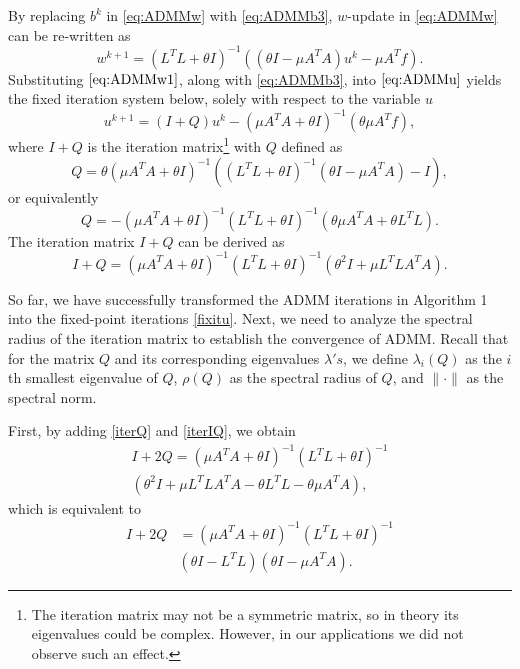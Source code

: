 \documentclass[letterpaper]{article} %
\begin{document}
By replacing $b^k$ in \eqref{eq:ADMMw} with \eqref{eq:ADMMb3}, $w$-update in \eqref{eq:ADMMw} can be re-written as
\begin{equation} \label{eq:ADMMw1}
w^{k + 1} = {( { {L^T}L + \theta I})^{ - 1}}( {( {\theta I - \mu{A^T}A}){u^k} - \mu{A^T}f}).
\end{equation}
Substituting $\eqref{eq:ADMMw1}$, along with \eqref{eq:ADMMb3}, into $\eqref{eq:ADMMu}$ yields the fixed iteration system below, solely with respect to the variable $u$
\begin{equation}\label{fixitu}
	u^{k+1} = \left(I+ Q\right) u^{k} - \left(\mu A^T A+\theta I\right)^{-1}\left(\theta \mu A^T f\right),
\end{equation}
where $I+Q$ is the iteration matrix\footnote{The iteration matrix may not be a symmetric matrix, so in theory its eigenvalues could be complex. However, in our applications we did not observe such an effect.} with $Q$ defined as
\begin{equation*}
    Q = \theta (\mu A^T A+\theta I)^{-1} ( ( {L^T}L +\theta I)^{-1} (\theta I -  \mu A^T A ) - I),
\end{equation*}
or equivalently
\begin{equation}\label{iterQ}
    Q = - (\mu A^T A + \theta I)^{-1} (L^T L + \theta I)^{-1} ( \theta \mu A^T A + \theta L^T L).
\end{equation}
The iteration matrix $I+Q$ can be derived as
\begin{equation}\label{iterIQ}
    I+Q = (\mu A^T A + \theta I)^{-1} (L^T L + \theta I)^{-1} ( \theta^2 I + \mu L^T L A^T A).
\end{equation}


So far, we have successfully transformed the ADMM iterations in Algorithm 1 into the fixed-point iterations \eqref{fixitu}. Next, we need to analyze the spectral radius of the iteration matrix to establish the convergence of ADMM. Recall that for the matrix $Q$ and its corresponding eigenvalues $\lambda's$, we define $\lambda_i(Q)$ as the $i$th smallest eigenvalue of $Q$, $\rho(Q)$ as the spectral radius of $Q$, and $\| \cdot \|$ as the spectral norm. 


First, by adding \eqref{iterQ} and \eqref{iterIQ}, we obtain
\begin{equation*}
\begin{split}
    I+2Q =  (\mu A^T A + \theta I)^{-1} (L^T L + \theta I)^{-1} \\
   ( \theta^2 I + \mu L^T L A^T A-\theta L^T L - \theta \mu  A^T A),
\end{split}
\end{equation*}
which is equivalent to
\begin{equation*}
\begin{split}
   I+2Q & = (\mu A^T A + \theta I)^{-1} (L^T L + \theta I)^{-1} \\
   & ( \theta I-L^T L)( \theta I-\mu A^T A).
\end{split}
\end{equation*}
\end{document}
